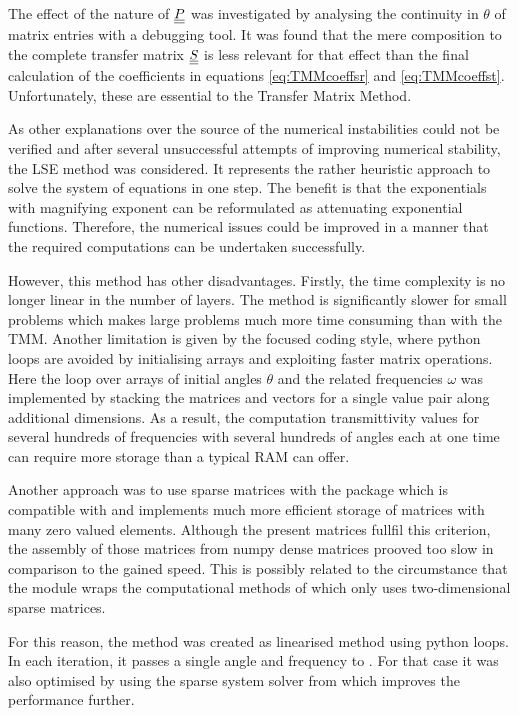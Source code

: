 The effect of the nature of $\underline{\underline{P}}$ was investigated by analysing
the continuity in $\theta$ of matrix entries with a debugging tool.
It was found that the mere composition to the complete transfer
matrix $\underline{\underline{S}}$ is less relevant for that effect than the final calculation
of the coefficients in equations \ref{eq:TMMcoeffsr} and \ref{eq:TMMcoeffst}.
Unfortunately, these are essential to the Transfer Matrix Method.

As other explanations over the source of the numerical instabilities could not
be verified and after several unsuccessful attempts of improving numerical
stability, the LSE method was considered. It represents the rather heuristic
approach to solve the system of equations in one step. The benefit is that
the exponentials with magnifying exponent can be reformulated as attenuating
exponential functions. Therefore, the numerical issues could be improved in a
manner that the required computations can be undertaken successfully.

However, this method has other disadvantages. Firstly, the time complexity is
no longer linear in the number of layers. %
The method is significantly slower for small problems which makes large
problems much more time consuming than with the TMM.
Another limitation is given by
the  focused coding style, where python loops are avoided by
initialising arrays and exploiting faster matrix operations. Here the loop over
arrays of initial angles $\theta$ and the related frequencies $\omega$ was
implemented by stacking the matrices and vectors for a single value pair along
additional dimensions. As a result, the computation transmittivity values for
several hundreds of frequencies with several hundreds of angles each at one
time can require more storage than a typical RAM can offer.

Another approach was to use sparse matrices
with the package  which is compatible with  and
implements much more efficient storage of matrices with many zero valued
elements. Although the present matrices fullfil this criterion, the assembly of
those matrices from numpy dense matrices prooved too slow in comparison to the
gained speed. This is possibly related to the circumstance that the module
wraps the computational methods of  which only uses
two-dimensional sparse matrices.

For this reason, the method  was created as linearised
method using python loops. In each iteration, it passes a single angle and
frequency to . For that case it was also optimised by using
the sparse system solver  from  which
improves the performance further.

